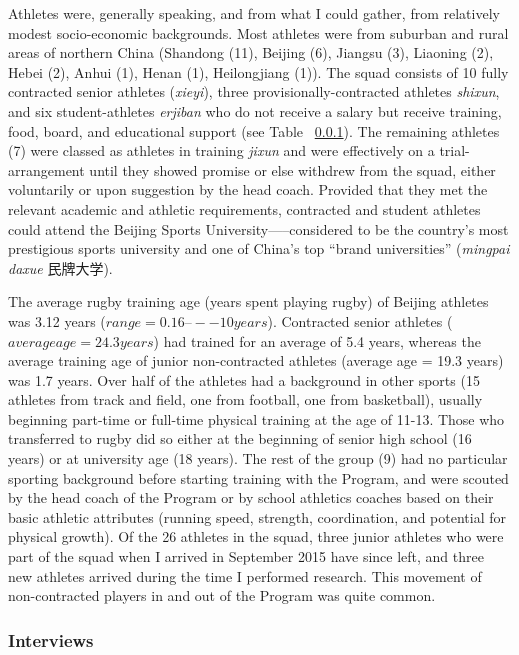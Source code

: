 Athletes were, generally speaking, and from what I could gather, from relatively modest socio-economic backgrounds.  Most athletes were from suburban and rural areas of northern China (Shandong (11), Beijing (6), Jiangsu (3), Liaoning (2), Hebei (2), Anhui (1), Henan (1), Heilongjiang (1)).  The squad consists of 10 fully contracted senior athletes (\textit{xieyi}), three provisionally-contracted athletes \textit{shixun}, and six student-athletes \textit{erjiban} who do not receive a salary but receive training, food, board, and educational support (see Table ~\ref{}).  The remaining athletes (7) were classed as athletes in training \textit{jixun} and were effectively on a trial-arrangement until they showed promise or else withdrew from the squad, either voluntarily or upon suggestion by the head coach.  Provided that they met the relevant academic and athletic requirements, contracted and student athletes could attend the Beijing Sports University—--considered to be the country's most prestigious sports university and one of China's top ``brand universities'' (\textit{mingpai daxue} 民牌大学).

The average rugby training age (years spent playing rugby) of Beijing athletes was 3.12 years ($range = 0.16 –-- 10 years$).  Contracted senior athletes ($average age = 24.3 years$) had trained for an average of 5.4 years, whereas the average training age of junior non-contracted athletes (average age = 19.3 years) was 1.7 years.  Over half of the athletes had a background in other sports (15 athletes from track and field, one from football, one from basketball), usually beginning part-time or full-time physical training at the age of 11-13.  Those who transferred to rugby did so either at the beginning of senior high school (16 years) or at university age (18 years).  The rest of the group (9) had no particular sporting background before starting training with the Program, and were scouted by the head coach of the Program or by school athletics coaches based on their basic athletic attributes (running speed, strength, coordination, and potential for physical growth).  Of the 26 athletes in the squad, three junior athletes who were part of the squad when I arrived in September 2015 have since left, and three new athletes arrived during the time I performed research. This movement of non-contracted players in and out of the Program was quite common.


\subsubsection{Interviews}

